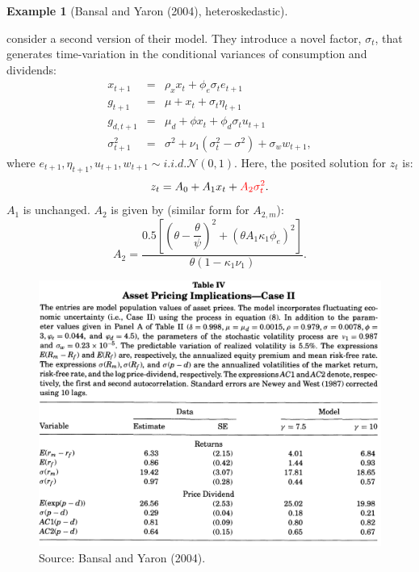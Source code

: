 \documentclass[
  12pt,
]{book}
\theoremstyle{definition}
\theoremstyle{definition}
\newtheorem{example}{Example}[chapter]
\theoremstyle{definition}
\theoremstyle{definition}
\theoremstyle{remark}
\begin{document}
\begin{example}[Bansal and Yaron (2004), heteroskedastic]
\protect\hypertarget{exm:BYHeterosk}{}\label{exm:BYHeterosk}

\citet{Bansal_Yaron_2004} consider a second version of their model. They introduce a novel factor, \(\sigma_t\), that generates time-variation in the conditional variances of consumption and dividends:
\begin{eqnarray}
x_{t+1} &=& \rho_x x_t + \phi_e \sigma_t e_{t+1} \nonumber\\
g_{t+1} &=& \mu + x_t + \sigma_t \eta_{t+1} \nonumber\\
g_{d,t+1} &=& \mu_d + \phi x_t + \phi_d \sigma_t u_{t+1} \nonumber\\
\sigma_{t+1}^2 &=& \sigma^2 + \nu_1(\sigma^2_t -\sigma^2) + \sigma_w w_{t+1}, \label{eq:BYheteroscked}
\end{eqnarray}
where \(e_{t+1},\eta_{t+1},u_{t+1},w_{t+1} \sim i.i.d. \mathcal{N}(0,1)\).
Here, the posited solution for \(z_t\) is:
\[
z_t = A_0 + A_1 x_t + {\color{red}A_2 \sigma^2_t}.
\]
\(A_1\) is unchanged. \(A_2\) is given by (similar form for \(A_{2,m}\)):
\[
A_2 = \frac{0.5 \left[ \left(\theta - \dfrac{\theta}{\psi}\right)^2 + (\theta A_1 \kappa_1 \phi_e)^2 \right]}{\theta(1 - \kappa_1 \nu_1)}.
\]

\begin{figure}

{\centering \includegraphics[width=1\linewidth]{figures/table_BY4} 

}

\caption{Source: Bansal and Yaron (2004).}\label{fig:BY4}
\end{figure}

\end{example}
\end{document}
